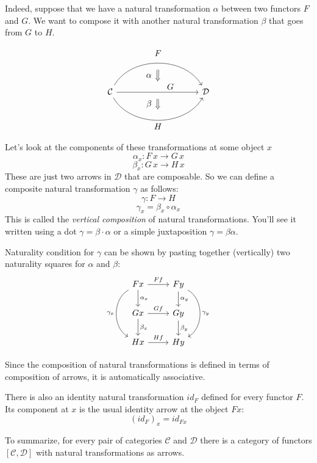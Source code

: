 \documentclass[DaoFP]{subfiles}
\begin{document}
Indeed, suppose that we have a natural transformation $\alpha$ between two functors $F$ and $G$. We want to compose it with another natural transformation $\beta$ that goes from $G$ to $H$. 

\[
\begin{tikzcd}[column sep=huge]
\mathcal{C}
  \arrow[bend left=60]{rr}[name=U, label=above:$F$]{}
  \arrow[]{rr}[name=M, label={[xshift=15pt, yshift=-5pt]:$G$}]{} 
  \arrow[bend right=60]{rr}[name=D, label=below:$H$]{} 
 &&
\mathcal{D}
  \arrow[shorten <=8pt, shorten >=8pt,Rightarrow, to path={(U) -- node[label=left:$\alpha$] {} (M)}]{}
  \arrow[shorten <=8pt, shorten >=8pt,Rightarrow, to path={(M) -- node[label=left:$\beta$] {} (D)}]{}
\end{tikzcd}
\]


Let's look at the components of these transformations at some object $x$
\[ \alpha_x \colon F \, x \to G \, x \]
\[ \beta_x \colon G \, x \to H \, x \]
These are just two arrows in $\mathcal{D}$ that are composable. So we can define a composite natural transformation $\gamma$ as follows:
\[ \gamma \colon F \to H\]
\[ \gamma_x = \beta_x \circ \alpha_x \]
 This is called the \emph{vertical composition} of natural transformations. You'll see it written using a dot $\gamma = \beta \cdot \alpha$ or a simple juxtaposition $\gamma = \beta \alpha$.

Naturality condition for $\gamma$ can be shown by pasting together (vertically) two naturality squares for $\alpha$ and $\beta$:
\[
 \begin{tikzcd}
 F x
 \arrow[d, "\alpha_x"]
 \arrow[r, "F f"]
 \arrow[dd, bend right = 60, "\gamma_x"']
 &
F y
  \arrow[d, "\alpha_y"]
 \arrow[dd, bend left = 60, "\gamma_y"]
 \\
G x
 \arrow[r, "G f"]
 \arrow[d, "\beta_x"]
& G y
\arrow[d, "\beta_y"]
\\
H x
\arrow[r, "H f"]
& H y
 \end{tikzcd}
\]

Since the composition of natural transformations is defined in terms of composition of arrows, it is automatically associative. 

There is also an identity natural transformation $id_F$ defined for every functor $F$. Its component at $x$ is the usual identity arrow at the object $F x$:
\[ (id_F)_x = id_{F x} \]

To summarize, for every pair of categories $\mathcal{C}$ and $\mathcal{D}$ there is a category of functors $[\mathcal{C}, \mathcal{D}]$ with natural transformations as arrows. 
\end{document}

